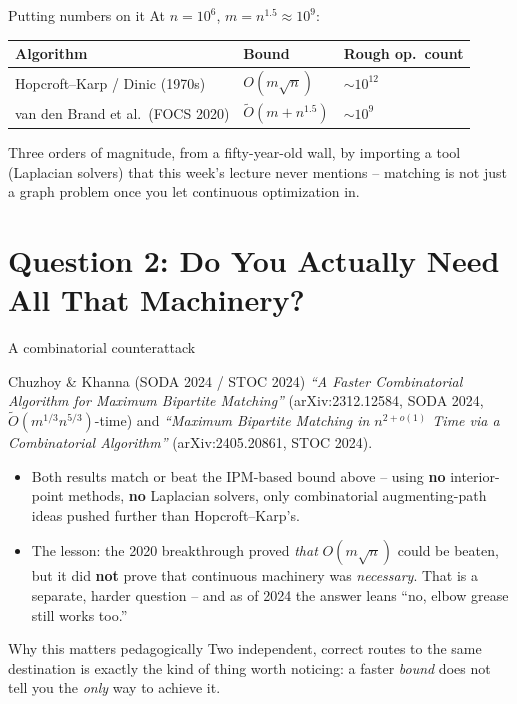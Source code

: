 \documentclass[11pt,aspectratio=169]{beamer}
\begin{document}
\begin{frame}{Putting numbers on it}
  \small
  At $n = 10^6$, $m = n^{1.5} \approx 10^9$:
  \begin{center}
  \begin{tabular}{@{}lll@{}}
    \toprule
    Algorithm & Bound & Rough op.\ count \\
    \midrule
    Hopcroft--Karp / Dinic (1970s) & $O(m\sqrt{n})$ & $\sim 10^{12}$ \\
    van den Brand et al.\ (FOCS 2020) & $\tilde{O}(m + n^{1.5})$ & $\sim 10^9$ \\
    \bottomrule
  \end{tabular}
  \end{center}
  Three orders of magnitude, from a fifty-year-old wall, by importing a tool
  (Laplacian solvers) that this week's lecture never mentions -- matching is not just
  a graph problem once you let continuous optimization in.
\end{frame}

\section{Question 2: Do You Actually Need All That Machinery?}

\begin{frame}{A combinatorial counterattack}
  \begin{block}{Chuzhoy \& Khanna (SODA 2024 / STOC 2024)}
    \emph{``A Faster Combinatorial Algorithm for Maximum Bipartite Matching''}
    (arXiv:2312.12584, SODA 2024, $\tilde O(m^{1/3}n^{5/3})$-time) and
    \emph{``Maximum Bipartite Matching in $n^{2+o(1)}$ Time via a Combinatorial
    Algorithm''} (arXiv:2405.20861, STOC 2024).
  \end{block}
  \begin{itemize}
    \item Both results match or beat the IPM-based bound above -- using \textbf{no}
    interior-point methods, \textbf{no} Laplacian solvers, only combinatorial
    augmenting-path ideas pushed further than Hopcroft--Karp's.
    \item The lesson: the 2020 breakthrough proved \emph{that} $O(m\sqrt n)$ could be
    beaten, but it did \textbf{not} prove that continuous machinery was
    \emph{necessary}. That is a separate, harder question -- and as of 2024 the answer
    leans ``no, elbow grease still works too.''
  \end{itemize}
  \begin{exampleblock}{Why this matters pedagogically}
    Two independent, correct routes to the same destination is exactly the kind of
    thing worth noticing: a faster \emph{bound} does not tell you the \emph{only} way
    to achieve it.
  \end{exampleblock}
\end{frame}
\end{document}
